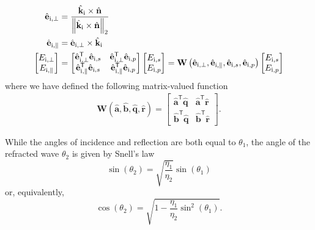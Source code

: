 \begin{equation}
    \label{eq:fresnel_in_vectors}
    \begin{aligned}
        \hat{\mathbf{e}}_{\text{i},\perp} &= \frac{\hat{\mathbf{k}}_\text{i} \times \hat{\mathbf{n}}}{\left\lVert\hat{\mathbf{k}}_\text{i} \times \hat{\mathbf{n}}\right\rVert_2} \\
        \hat{\mathbf{e}}_{\text{i},\parallel} &= \hat{\mathbf{e}}_{\text{i},\perp} \times \hat{\mathbf{k}}_\text{i}\\
        \begin{bmatrix}E_{\text{i},\perp} \\ E_{\text{i},\parallel} \end{bmatrix} &=
            \begin{bmatrix}
                \hat{\mathbf{e}}_{\text{i},\perp}^\mathsf{T}\hat{\mathbf{e}}_{\text{i},s} & \hat{\mathbf{e}}_{\text{i},\perp}^\mathsf{T}\hat{\mathbf{e}}_{\text{i},p}\\
                \hat{\mathbf{e}}_{\text{i},\parallel}^\mathsf{T}\hat{\mathbf{e}}_{\text{i},s} & \hat{\mathbf{e}}_{\text{i},\parallel}^\mathsf{T}\hat{\mathbf{e}}_{\text{i},p}
            \end{bmatrix}
         \begin{bmatrix}E_{\text{i},s} \\ E_{\text{i},p}\end{bmatrix} =
         \mathbf{W}\left(\hat{\mathbf{e}}_{\text{i},\perp}, \hat{\mathbf{e}}_{\text{i},\parallel}, \hat{\mathbf{e}}_{\text{i},s}, \hat{\mathbf{e}}_{\text{i},p}\right) \begin{bmatrix}E_{\text{i},s} \\ E_{\text{i},p}\end{bmatrix}
    \end{aligned}
\end{equation}
where we have defined the following matrix-valued function
\begin{align}
    \label{eq:W}
    \mathbf{W}\left(\hat{\mathbf{a}}, \hat{\mathbf{b}}, \hat{\mathbf{q}}, \hat{\mathbf{r}} \right) =
    \begin{bmatrix}
        \hat{\mathbf{a}}^\textsf{T} \hat{\mathbf{q}} & \hat{\mathbf{a}}^\textsf{T} \hat{\mathbf{r}} \\
        \hat{\mathbf{b}}^\textsf{T} \hat{\mathbf{q}} & \hat{\mathbf{b}}^\textsf{T} \hat{\mathbf{r}}
    \end{bmatrix}.
\end{align}

While the angles of incidence and reflection are both equal to $\theta_1$, the angle of the refracted wave $\theta_2$ is given by Snell's law
\begin{equation}
    \sin(\theta_2) = \sqrt{\frac{\eta_1}{\eta_2}} \sin(\theta_1)
\end{equation}
or, equivalently,
\begin{equation}
    \cos(\theta_2) = \sqrt{1 - \frac{\eta_1}{\eta_2} \sin^2(\theta_1)}.
\end{equation}

